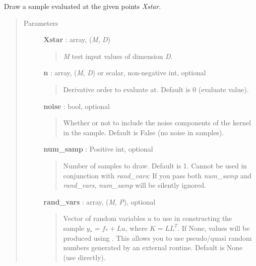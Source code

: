 \documentclass[letterpaper,10pt,english]{sphinxmanual}
\begin{document}
\begin{fulllineitems}
\begin{fulllineitems}
\label{gptools:gptools.gaussian_process.GaussianProcess.draw_sample}
Draw a sample evaluated at the given points \emph{Xstar}.
\begin{quote}\begin{description}
\item[{Parameters}] \leavevmode
\textbf{Xstar} : array, (\emph{M}, \emph{D})
\begin{quote}

\emph{M} test input values of dimension \emph{D}.
\end{quote}

\textbf{n} : array, (\emph{M}, \emph{D}) or scalar, non-negative int, optional
\begin{quote}

Derivative order to evaluate at. Default is 0 (evaluate value).
\end{quote}

\textbf{noise} : bool, optional
\begin{quote}

Whether or not to include the noise components of the kernel in the
sample. Default is False (no noise in samples).
\end{quote}

\textbf{num\_samp} : Positive int, optional
\begin{quote}

Number of samples to draw. Default is 1. Cannot be used in
conjunction with \emph{rand\_vars}: If you pass both \emph{num\_samp} and
\emph{rand\_vars}, \emph{num\_samp} will be silently ignored.
\end{quote}

\textbf{rand\_vars} : array, (\emph{M}, \emph{P}), optional
\begin{quote}

Vector of random variables \(u\) to use in constructing the
sample \(y_* = f_* + Lu\), where \(K=LL^T\). If None,
values will be produced using
. This allows you to use
pseudo/quasi random numbers generated by an external routine.
Default is None (use  directly).
\end{quote}


\end{description}
\end{quote}
\end{fulllineitems}
\end{fulllineitems}
\end{document}
